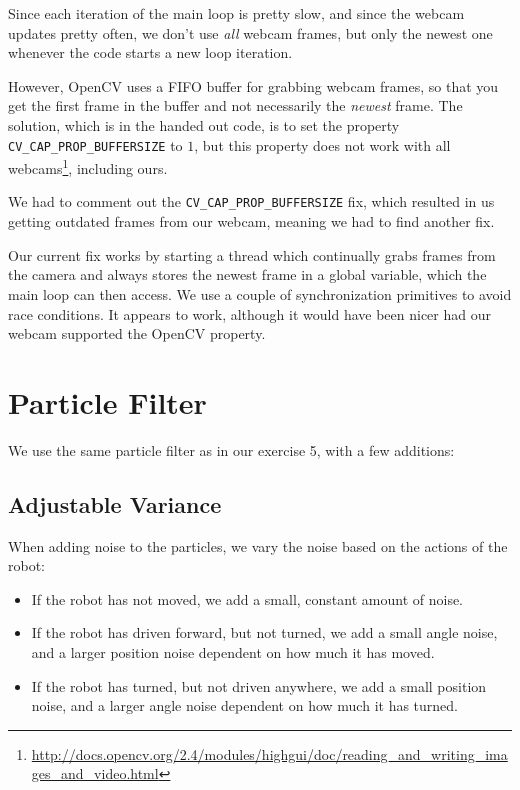 \documentclass[a4paper,12pt]{article}
\begin{document}
Since each iteration of the main loop is pretty slow, and since the webcam
updates pretty often, we don't use \emph{all} webcam frames, but only the newest
one whenever the code starts a new loop iteration.

However, OpenCV uses a FIFO buffer for grabbing webcam frames, so that you get
the first frame in the buffer and not necessarily the \emph{newest} frame.  The
solution, which is in the handed out code, is to set the property
\texttt{CV_CAP_PROP_BUFFERSIZE} to $1$, but this property does not work with all
webcams\footnote{\url{http://docs.opencv.org/2.4/modules/highgui/doc/reading_and_writing_images_and_video.html}},
including ours.

We had to comment out the \texttt{CV_CAP_PROP_BUFFERSIZE} fix, which resulted in
us getting outdated frames from our webcam, meaning we had to find another fix.

Our current fix works by starting a thread which continually grabs frames from
the camera and always stores the newest frame in a global variable, which the
main loop can then access.  We use a couple of synchronization primitives to
avoid race conditions.  It appears to work, although it would have been nicer
had our webcam supported the OpenCV property.


\section{Particle Filter}

We use the same particle filter as in our exercise 5, with a few additions:

\subsection{Adjustable Variance}

When adding noise to the particles, we vary the noise based on the actions of
the robot:

\begin{itemize}
\item If the robot has not moved, we add a small, constant amount of noise.
\item If the robot has driven forward, but not turned, we add a small angle
noise, and a larger position noise dependent on how much it has moved.
\item If the robot has turned, but not driven anywhere, we add a small position
noise, and a larger angle noise dependent on how much it has turned.
\end{itemize}
\end{document}
